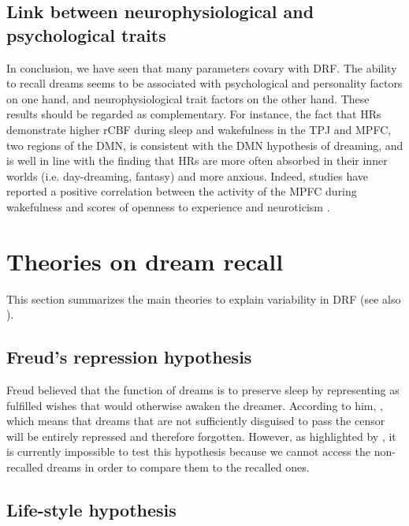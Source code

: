 \subsection{Link between neurophysiological and psychological traits}
\label{sec:dream-recall:param:link}

In conclusion, we have seen that many parameters covary with DRF. The ability to recall dreams seems to be associated with psychological and personality factors on one hand, and neurophysiological trait factors on the other hand. These results should be regarded as complementary. For instance, the fact that HRs demonstrate higher rCBF during sleep and wakefulness in the TPJ and MPFC, two regions of the DMN, is consistent with the DMN hypothesis of dreaming, and is well in line with the finding that HRs are more often absorbed in their inner worlds (i.e. day-dreaming, fantasy) and more anxious. Indeed, studies have reported a positive correlation between the activity of the MPFC during wakefulness and scores of openness to experience \citep{sutin_sex_2009} and neuroticism \citep{zald_brain_2002}.

\section{Theories on dream recall}
\label{sec:dream-recall:theories}

This section summarizes the main theories to explain variability in DRF (see also \citealp{schredl_dream_1996}).

\subsection{Freud’s repression hypothesis}
\label{sec:dream-recall:theories:freud}

Freud believed that the function of dreams is to preserve sleep by representing as fulfilled wishes that would otherwise awaken the dreamer. According to him,  \citep{freud_interpretation_1900}, which means that dreams that are not sufficiently disguised to pass the censor will be entirely repressed and therefore forgotten. However, as highlighted by \citet{schredl_dream_1999}, it is currently impossible to test this hypothesis because we cannot access the non-recalled dreams in order to compare them to the recalled ones.

\subsection{Life-style hypothesis}
\label{sec:dream-recall:theories:life-style}

